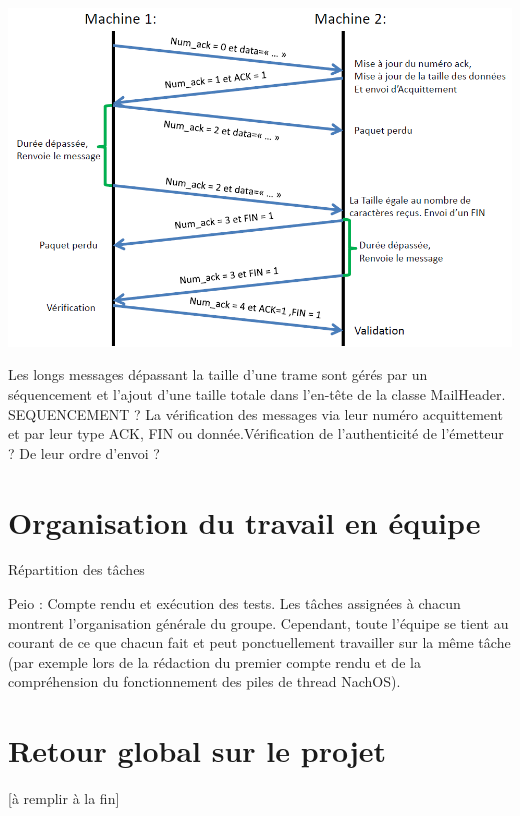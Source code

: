\documentclass[12pt]{report}
\begin{document}
\begin{center}
\includegraphics[scale=0.6]{protocoleReseau}
\end{center}

\bigskip


Les longs messages dépassant la taille d’une trame sont gérés par
un séquencement et l’ajout d'une taille totale dans l’en-tête de la classe MailHeader. \color{red}SEQUENCEMENT ?\color{black}
La vérification des messages via leur numéro acquittement et par leur type ACK, FIN ou donnée.\color{red}Vérification de l'authenticité de l'émetteur ? De leur ordre d'envoi ?\color{black}

\chapter{Organisation du travail en équipe}
Répartition des tâches

Peio : Compte rendu et exécution des tests.
Les tâches assignées à chacun montrent l’organisation générale du groupe. Cependant, toute l’équipe se tient au courant de ce que chacun fait et peut ponctuellement travailler sur la même tâche (par exemple lors de la rédaction du premier compte rendu et de la compréhension du fonctionnement des piles de thread NachOS).


\chapter{Retour global sur le projet}

[à remplir à la fin]
\end{document}
